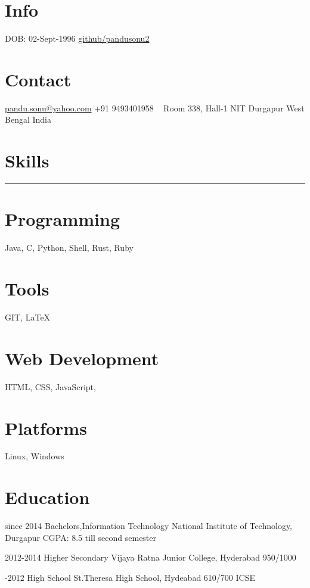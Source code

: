 \documentclass[]{friggeri-cv-a4}
\begin{document}


\begin{aside}
\section{Info}
DOB: 02-Sept-1996
\href{http://github.com/pandusonu2}{github/pandusonu2}

\section{Contact}
\href{mailto:pandu.sonu@yahoo.com}{pandu.sonu@yahoo.com}
+91 9493401958
~
Room 338, Hall-1
NIT Durgapur
West Bengal
India
~
\section{Skills}
\noindent\rule{3cm}{0.5pt}
\section{Programming}
Java, C, Python, Shell, Rust, Ruby
\section{Tools}
GIT, \LaTeX
\section{Web Development}
HTML, CSS, JavaScript,
\section{Platforms}
Linux, Windows
\end{aside}


\section{Education}

\begin{entrylist}

\entry
{since 2014}
{Bachelors,{\normalfont Information Technology}}
{National Institute of Technology, Durgapur}
{CGPA: 8.5 till second semester}
{}

\entry
{2012-2014}
{Higher Secondary}
{Vijaya Ratna Junior College, Hyderabad}
{950/1000}
{}

\entry
{-2012}
{High School}
{St.Theresa High School, Hydeabad}
{610/700 ICSE}
{}

\end{entrylist}
\end{document}
